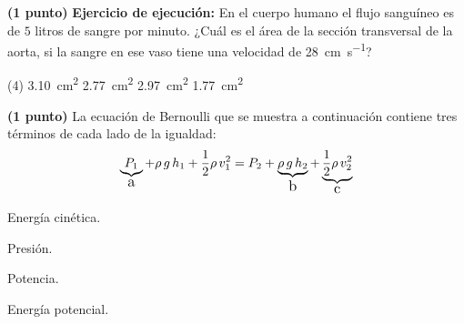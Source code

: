 \documentclass[12pt, letter]{exam}
\begin{document}
\begin{questions}
    \question\textbf{(1 punto)} \label{Problema_03} \textbf{Ejercicio de ejecución: } En el cuerpo humano el flujo sanguíneo es de $5$ litros de sangre por minuto. ¿Cuál es el área de la sección transversal de la aorta, si la sangre en ese vaso tiene una velocidad de \SI{28}{\centi\meter\per\second}?
    \begin{tasks}(4)
        \task \SI{3.10}{\square\centi\meter}
        \task \SI{2.77}{\square\centi\meter}
        \task \SI{2.97}{\square\centi\meter}
        \task \SI{1.77}{\square\centi\meter}
    \end{tasks}

    \newpage

    \question\textbf{(1 punto)} La ecuación de Bernoulli que se muestra a continuación contiene tres términos de cada lado de la igualdad:
    \begin{align*}
    \underbrace{P_{1}}_{\text{\large{a}}} + \rho \, g \, h_{1} + \dfrac{1}{2} \rho \, v_{1}^{2} = P_{2} + \underbrace{\rho \, g \, h_{2}}_{\text{\large{b}}} + \underbrace{\dfrac{1}{2} \rho \, v_{2}^{2}}_{\text{\large{c}}}
    \end{align*}
        
    \vspace{0.5em}
    \begin{inparaenum}[I)]
            \item Energía cinética. \quad \quad
            \item Presión. \quad \quad
            \item Potencia. \quad \quad
            \item Energía potencial. \quad \quad
    \end{inparaenum}


\end{questions}
\end{document}
